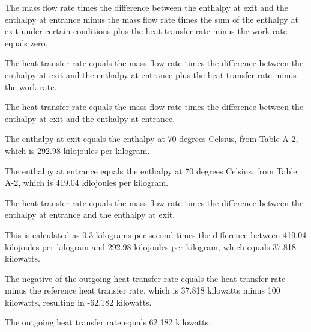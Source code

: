 The mass flow rate times the difference between the enthalpy at exit and the enthalpy at entrance minus the mass flow rate times the sum of the enthalpy at exit under certain conditions plus the heat transfer rate minus the work rate equals zero.

The heat transfer rate equals the mass flow rate times the difference between the enthalpy at exit and the enthalpy at entrance plus the heat transfer rate minus the work rate.

The heat transfer rate equals the mass flow rate times the difference between the enthalpy at exit and the enthalpy at entrance.

The enthalpy at exit equals the enthalpy at 70 degrees Celsius, from Table A-2, which is 292.98 kilojoules per kilogram.

The enthalpy at entrance equals the enthalpy at 70 degrees Celsius, from Table A-2, which is 419.04 kilojoules per kilogram.

The heat transfer rate equals the mass flow rate times the difference between the enthalpy at entrance and the enthalpy at exit.

This is calculated as 0.3 kilograms per second times the difference between 419.04 kilojoules per kilogram and 292.98 kilojoules per kilogram, which equals 37.818 kilowatts.

The negative of the outgoing heat transfer rate equals the heat transfer rate minus the reference heat transfer rate, which is 37.818 kilowatts minus 100 kilowatts, resulting in -62.182 kilowatts.

The outgoing heat transfer rate equals 62.182 kilowatts.